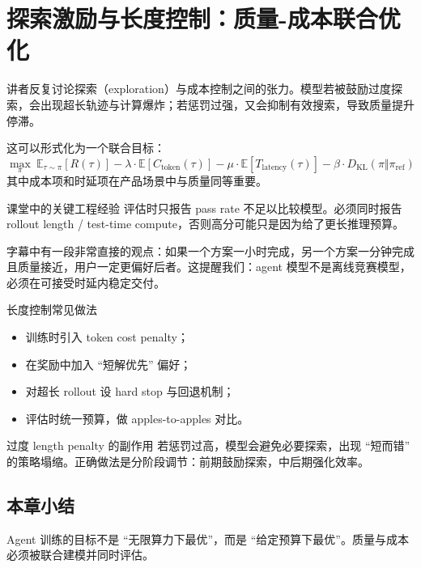 \section{探索激励与长度控制：质量-成本联合优化}

讲者反复讨论探索（exploration）与成本控制之间的张力。模型若被鼓励过度探索，会出现超长轨迹与计算爆炸；若惩罚过强，又会抑制有效搜索，导致质量提升停滞。

这可以形式化为一个联合目标：
\[
\max_{\pi} \ \mathbb{E}_{\tau \sim \pi}\left[R(\tau)\right]
- \lambda \cdot \mathbb{E}[C_{\text{token}}(\tau)]
- \mu \cdot \mathbb{E}[T_{\text{latency}}(\tau)]
- \beta \cdot D_{\mathrm{KL}}(\pi \Vert \pi_{\text{ref}})
\]
其中成本项和时延项在产品场景中与质量同等重要。

\begin{importantbox}{课堂中的关键工程经验}
评估时只报告 pass rate 不足以比较模型。必须同时报告 rollout length / test-time compute，否则高分可能只是因为给了更长推理预算。
\end{importantbox}

字幕中有一段非常直接的观点：如果一个方案一小时完成，另一个方案一分钟完成且质量接近，用户一定更偏好后者。这提醒我们：agent 模型不是离线竞赛模型，必须在可接受时延内稳定交付。

\begin{knowledgebox}{长度控制常见做法}
\begin{itemize}
    \item 训练时引入 token cost penalty；
    \item 在奖励中加入 ``短解优先'' 偏好；
    \item 对超长 rollout 设 hard stop 与回退机制；
    \item 评估时统一预算，做 apples-to-apples 对比。
\end{itemize}
\end{knowledgebox}

\begin{warningbox}{过度 length penalty 的副作用}
若惩罚过高，模型会避免必要探索，出现 ``短而错'' 的策略塌缩。正确做法是分阶段调节：前期鼓励探索，中后期强化效率。
\end{warningbox}

\subsection{本章小结}
Agent 训练的目标不是 ``无限算力下最优''，而是 ``给定预算下最优''。质量与成本必须被联合建模并同时评估。

